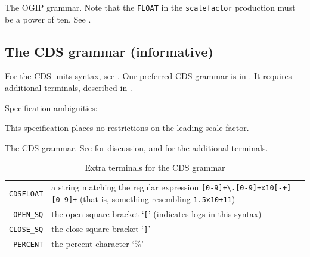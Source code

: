 \documentclass[11pt,a4paper]{ivoa}
\newcommand{\units}[1]{{\let~\thinspace
  \ifmmode
    \,\textrm{#1}%
  \else
    \nobreak$\,\mathrm{#1}$%
  \fi}}
\begin{document}
\begin{table}[ht]

\caption[The OGIP grammar]{\label{tabx:ogipgrammar}The OGIP grammar.
Note that the \texttt{FLOAT} in the \texttt{scalefactor} production
must be a power of ten.
See .}
\end{table}
\clearpage

\subsection{The CDS grammar (informative)}
\label{appx:cdsgrammar}

For the CDS units syntax, see \cite[\S3.2]{cds00}.  Our preferred CDS
grammar is in .  It requires additional
terminals, described in .

Specification ambiguities:

This specification places no restrictions on the leading scale-factor.

\begin{table}[ht]

\caption[The CDS grammar]{\label{tabx:cdsgrammar}The CDS grammar.
See  for discussion,
and  for the additional terminals.}
\end{table}
\begin{table}[ht]
\begin{tabular}{rL{10cm}}
\texttt{CDSFLOAT}&a string matching the regular
expression \texttt{[0-9]+\textbackslash.[0-9]+x10[-+][0-9]+}
(that is, something resembling \texttt{1.5x10+11})\\
\texttt{OPEN\_SQ}&the open square bracket `\texttt{[}' (indicates logs
  in this syntax)\\
\texttt{CLOSE\_SQ}&the close square bracket `\texttt{]}'\\
\texttt{PERCENT}&the percent character `\%'
\end{tabular}
\caption[Extra CDS terminals]{\label{tabx:cdsterminals}Extra terminals
for the CDS grammar}
\end{table}
\clearpage
\end{document}
